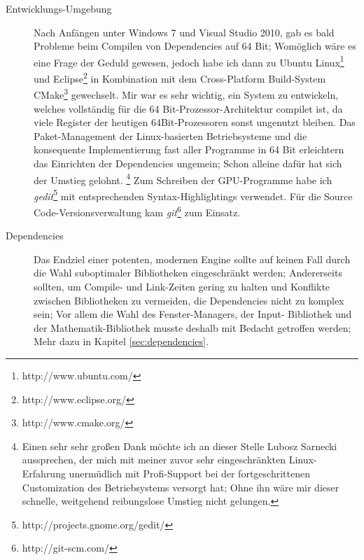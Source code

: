 \begin{description}

	\item[Entwicklungs-Umgebung]
	Nach Anfängen unter Windows 7 und Visual Studio 2010, gab es bald Probleme beim Compilen von Dependencies auf 
	64 Bit; Womöglich wäre es eine Frage der Geduld gewesen, jedoch habe ich dann zu 
	Ubuntu Linux\footnote{http://www.ubuntu.com/} und Eclipse\footnote{http://www.eclipse.org/} in 
	Kombination mit dem Cross-Platform Build-System CMake\footnote{http://www.cmake.org/} gewechselt. Mir war es sehr 	
	wichtig, ein System zu entwickeln, welches vollständig für die 64 Bit-Prozessor-Architektur compilet ist, da viele 
	Register der heutigen 64Bit-Prozessoren sonst ungenutzt bleiben.
	Das Paket-Management der Linux-basierten Betriebsysteme und die konsequente Implementierung fast aller Programme in 64 
	Bit erleichtern das Einrichten der Dependencies ungemein; Schon alleine dafür hat sich der Umstieg 
	gelohnt.
	\footnote{Einen sehr sehr großen Dank möchte ich an dieser Stelle Lubosz Sarnecki aussprechen, der mich mit 
	meiner zuvor sehr eingeschränkten Linux-Erfahrung unermüdlich mit Profi-Support bei der fortgeschrittenen Customization 
	des Betriebsystems versorgt hat; Ohne ihn wäre mir dieser schnelle, weitgehend reibungslose Umstieg nicht gelungen.}
	Zum Schreiben der GPU-Programme habe ich \emph{gedit}\footnote{http://projects.gnome.org/gedit/}
	mit entsprechenden Syntax-Highlightings verwendet.
	Für die Source Code-Versionsverwaltung kam \emph{git}\footnote{http://git-scm.com/} zum Einsatz.

	\item[Dependencies]
	\label{focus:dependencies}
	Das Endziel einer potenten, modernen Engine sollte auf keinen Fall durch die Wahl suboptimaler Bibliotheken 
	eingeschränkt werden; Andererseits sollten, um Compile- und Link-Zeiten gering zu halten und Konflikte zwischen 
	Bibliotheken zu vermeiden, die Dependencies nicht zu komplex sein; Vor allem die Wahl des Fenster-Managers, der Input-
	Bibliothek und der Mathematik-Bibliothek musste deshalb mit Bedacht getroffen werden; Mehr dazu in Kapitel 
	\ref{sec:dependencies}.
	
	
	

\end{description}
